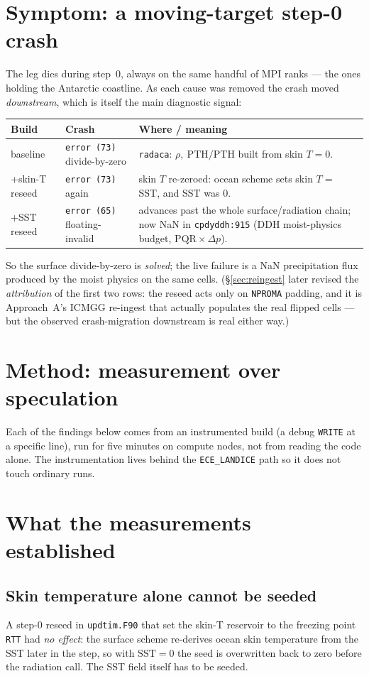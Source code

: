 \documentclass[11pt,a4paper]{article}
\newcommand{\code}[1]{\texttt{\small #1}}
\newcommand{\file}[1]{\texttt{\footnotesize #1}}
\begin{document}
\section{Symptom: a moving-target step-0 crash}
The leg dies during step~0, always on the same handful of MPI ranks --- the ones holding
the Antarctic coastline. As each cause was removed the crash moved \emph{downstream},
which is itself the main diagnostic signal:
\begin{center}
\begin{tabular}{@{}llp{}@{}}
\toprule
\textbf{Build} & \textbf{Crash} & \textbf{Where / meaning}\\
\midrule
baseline & \code{error (73)} divide-by-zero & \code{radaca}: $\rho,\ \mathrm{PTH}/\mathrm{PTH}$ built from skin $T=0$.\\
+skin-T reseed & \code{error (73)} again & skin $T$ re-zeroed: ocean scheme sets skin $T=$ SST, and SST was $0$.\\
+SST reseed & \code{error (65)} floating-invalid & advances past the whole surface/radiation chain; now NaN in \code{cpdyddh:915} (DDH moist-physics budget, $\mathrm{PQR}\times\Delta p$).\\
\bottomrule
\end{tabular}
\end{center}
So the surface divide-by-zero is \emph{solved}; the live failure is a NaN precipitation
flux produced by the moist physics on the same cells. (\S\ref{sec:reingest} later revised
the \emph{attribution} of the first two rows: the reseed acts only on \code{NPROMA}
padding, and it is Approach~A's ICMGG re-ingest that actually populates the real flipped
cells --- but the observed crash-migration downstream is real either way.)

\section{Method: measurement over speculation}
Each of the findings below comes from an instrumented build (a debug \code{WRITE} at a
specific line), run for five minutes on compute nodes, not from reading the code alone.
The instrumentation lives behind the \code{ECE\_LANDICE} path so it does not touch
ordinary runs.

\section{What the measurements established}\label{sec:meas}

\subsection{Skin temperature alone cannot be seeded}
A step-0 reseed in \file{updtim.F90} that set the skin-T reservoir to the freezing point
\code{RTT} had \emph{no effect}: the surface scheme re-derives ocean skin temperature from
the SST later in the step, so with $\mathrm{SST}=0$ the seed is overwritten back to zero
before the radiation call. The SST field itself has to be seeded.
\end{document}
